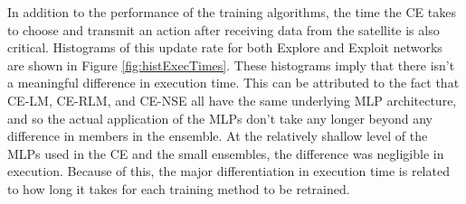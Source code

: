 \par In addition to the performance of the training algorithms, the time the CE takes to choose and transmit an action after receiving data from the satellite is also critical. Histograms of this update rate for both Explore and Exploit networks are shown in Figure \ref{fig:histExecTimes}. These histograms imply that there isn't a meaningful difference in execution time. This can be attributed to the fact that CE-LM, CE-RLM, and CE-NSE all have the same underlying MLP architecture, and so the actual application of the MLPs don't take any longer beyond any difference in members in the ensemble. At the relatively shallow level of the MLPs used in the CE and the small ensembles, the difference was negligible in execution. Because of this, the major differentiation in execution time is related to how long it takes for each training method to be retrained.
